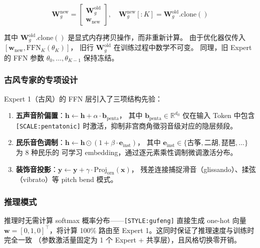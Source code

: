 \begin{equation}
\mathbf{W}_g^{\text{new}} = \begin{bmatrix}
\mathbf{W}_g^{\text{old}} \\ \hline
\mathbf{w}_{\text{new}}
\end{bmatrix},
\quad
\mathbf{W}_g^{\text{new}}[:K] = \mathbf{W}_g^{\text{old}}.\text{clone}()
\end{equation}

其中 $\mathbf{W}_g^{\text{old}}.\text{clone}()$ 是显式内存拷贝操作，而非重新计算。
由于优化器仅传入 $[\mathbf{w}_{\text{new}}, \text{FFN}_{K}(\theta_K)]$，
旧行 $\mathbf{W}_g^{\text{old}}$ 在训练过程中数学不可变。
同理，旧 Expert 的 FFN 参数 $\theta_0, \dots, \theta_{K-1}$ 保持冻结。

\subsubsection{古风专家的专项设计}

Expert 1（古风）的 FFN 层引入了三项结构先验：

\begin{enumerate}[leftmargin=2em]
\item \textbf{五声音阶偏置}：$\mathbf{h} \leftarrow \mathbf{h} + \alpha \cdot \mathbf{b}_{\text{penta}}$，
其中 $\mathbf{b}_{\text{penta}} \in \mathbb{R}^{d_{\text{ff}}}$ 仅在输入 Token 中包含
\texttt{[SCALE:pentatonic]} 时激活，抑制非宫商角徵羽音级对应的隐层频段。
\item \textbf{民乐音色调制}：$\mathbf{h} \leftarrow \mathbf{h} \odot (1 + \beta \cdot \mathbf{e}_{\text{inst}})$，
其中 $\mathbf{e}_{\text{inst}} \in \{\text{古筝}, \text{二胡}, \text{琵琶}, \dots\}$ 为 8 种民乐的
可学习 embedding，通过逐元素乘性调制微调激活分布。
\item \textbf{装饰音投影}：$\mathbf{y} \leftarrow \mathbf{y} + \gamma \cdot \text{Proj}_{\text{orn}}(\mathbf{x})$，
残差连接捕捉滑音（glissando）、揉弦（vibrato）等 pitch bend 模式。
\end{enumerate}

\subsubsection{推理模式}

推理时无需计算 softmax 概率分布——\texttt{[STYLE:gufeng]} 直接生成 one-hot 向量
$\mathbf{w} = [0, 1, 0]^\top$，将计算 100\% 路由至 Expert 1。这同时保证了推理速度与训练时完全一致
（参数激活量固定为 1 个 Expert + 共享层），且风格切换零开销。

